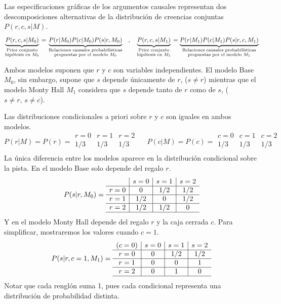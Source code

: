 \documentclass[a4paper,10pt]{article}
\begin{document}
Las especificaciones gráficas de los argumentos causales representan dos descomposiciones alternativas de la distribución de creencias conjuntas $P(r,c,s|M)$.
$$\underbrace{P(r,c,s|M_0)}_{\hfrac{\text{\scriptsize Prior conjunto}}{\text{\scriptsize hipótesis en $M_0$}}} = \underbrace{P(r|M_0)P(c|M_0)P(s|r,M_0)}_{\hfrac{\text{\scriptsize Relaciones causales probabilísticas}}{\text{\scriptsize propuestas por el modelo $M_0$}}} \hspace{0.3cm} , \hspace{0.3cm} \underbrace{P(r,c,s|M_1)}_{\hfrac{\text{\scriptsize Prior conjunto}}{\text{\scriptsize hipótesis en $M_1$}}} = \underbrace{P(r|M_1)P(c|M_1)P(s|r,c,M_1)}_{\hfrac{\text{\scriptsize Relaciones causales probabilísticas}}{\text{\scriptsize propuestas por el modelo $M_1$}}}$$

Ambos modelos suponen que $r$ y $c$ son variables independientes.
El modelo Base $M_0$, sin embargo, supone que $s$ depende únicamente de $r$, ($s\neq r$) mientras que el modelo Monty Hall $M_1$ considera que $s$ depende tanto de $r$ como de $s$, ($s\neq r, \, s\neq c$).

Las distribuciones condicionales a priori sobre $r$ y $c$ son iguales en ambos modelos.
$$
P(r|M) = P(r) = \begin{array}{c|c|c}
  r=0 & r=1 & r=2 \\
  \hline
  1/3 & 1/3 & 1/3 \\
\end{array}
\ \ \ \ \ \
P(c|M) = P(c) = \begin{array}{c|c|c}
  c=0 & c=1 & c=2 \\
  \hline
  1/3 & 1/3 & 1/3 \\
\end{array}
$$
La única diferencia entre los modelos aparece en la distribución condicional sobre la pista. En el modelo Base solo depende del regalo $r$.
$$
P(s|r,M_0) = \begin{array}{c|c|c|c}
  & s=0 & s=1 & s=2 \\ \hline
 r=0 & 0 & 1/2 & 1/2 \\ \hline
 r=1 & 1/2 & 0 & 1/2 \\ \hline
 r=2 & 1/2 & 1/2 & 0 \\ \hline
\end{array}
$$
Y en el modelo Monty Hall depende del regalo $r$ y la caja cerrada $c$. Para simplificar, mostraremos los valores cuando $c=1$.
$$
P(s|r,c=1,M_1) = \begin{array}{c|c|c|c}
 (c=0) & s=0 & s=1 & s=2 \\ \hline
 r=0 & 0 & 1/2 & 1/2 \\ \hline
 r=1 & 0 & 0 & 1 \\ \hline
 r=2 & 0 & 1 & 0 \\ \hline
\end{array}
$$
Notar que cada renglón suma 1, pues cada condicional representa una distribución de probabilidad distinta.
\end{document}
